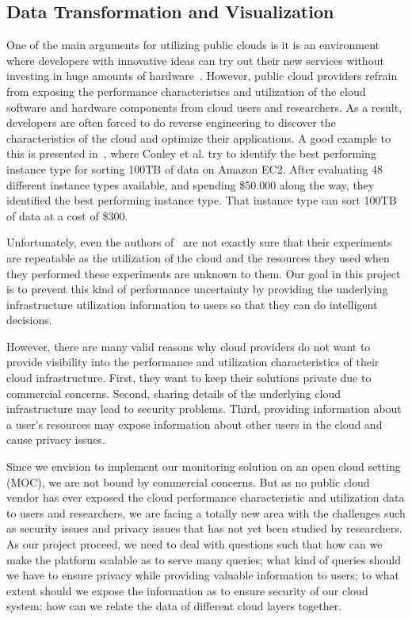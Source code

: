 \subsection{Data Transformation and Visualization} 

One of the main arguments for utilizing public clouds is it is an environment where developers with innovative ideas can try out their new services without investing in huge amounts of hardware~\cite{Armbrust2009}. However, public cloud providers refrain from exposing the performance characteristics and utilization of the cloud software and hardware components from cloud users and researchers. As a result, developers are often forced to do reverse engineering to discover the characteristics of the cloud and optimize their applications. A good example to this is presented in~\cite{conley2015achieving}, where Conley et al. try to identify the best performing instance type for sorting 100TB of data on Amazon EC2. After evaluating 48 different instance types available, and spending \$50.000 along the way, they identified the best performing instance type. That instance type can sort 100TB of data at a cost of \$300. 

Unfortunately, even the authors of~\cite{conley2015achieving} are not exactly sure that their experiments are repeatable as the utilization of the cloud and the resources they used when they performed these experiments are unknown to them. Our goal in this project is to prevent this kind of performance uncertainty by providing the underlying infrastructure utilization information to users so that they can do intelligent decisions.          

However, there are many valid reasons why cloud providers do not want to provide visibility into the performance and utilization characteristics of their cloud infrastructure. First, they want to keep their solutions private due to commercial concerns. Second, sharing details of the underlying cloud infrastructure may lead to security problems. Third, providing information about a user's resources may expose information about other users in the cloud and cause privacy issues. 

Since we envision to implement our monitoring solution on an open cloud setting (MOC), we are not bound by commercial concerns. But as no public cloud vendor has ever exposed the cloud performance characteristic and utilization data to users and researchers, we are facing a totally new area with the challenges such as security issues and privacy issues that has not yet been studied by researchers. As our project proceed, we need to deal with questions such that how can we make the platform scalable as to serve many queries; what kind of queries should we have to ensure privacy while providing valuable information to users; to what extent should we expose the information as to ensure security of our cloud system; how can we relate the data of different cloud layers together.

